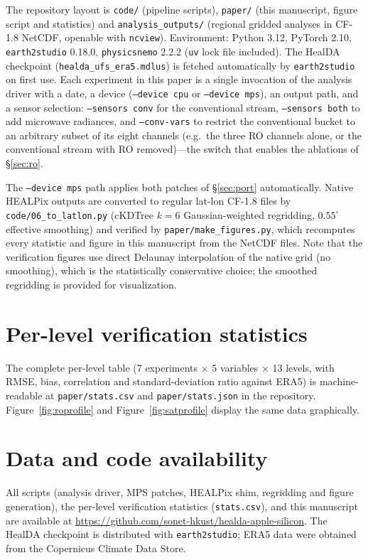 \documentclass[twocolumn,11pt]{article}
\begin{document}
The repository layout is
\texttt{code/} (pipeline scripts), \texttt{paper/} (this manuscript,
figure script and statistics) and \texttt{analysis\_outputs/}
(regional gridded analyses in CF-1.8 NetCDF, openable with
\texttt{ncview}). Environment: Python 3.12, PyTorch 2.10,
\texttt{earth2studio} 0.18.0, \texttt{physicsnemo} 2.2.2
(\texttt{uv} lock file included). The HealDA checkpoint
(\texttt{healda\_ufs\_era5.mdlus}) is fetched automatically by
\texttt{earth2studio} on first use. Each experiment in this paper is
a single invocation of the analysis driver with a date, a device
(\texttt{--device cpu} or \texttt{--device mps}), an output path, and
a sensor selection: \texttt{--sensors conv} for the conventional
stream, \texttt{--sensors both} to add microwave radiances, and
\texttt{--conv-vars} to restrict the conventional bucket to an
arbitrary subset of its eight channels (e.g.\ the three RO channels
alone, or the conventional stream with RO removed)---the switch that
enables the ablations of \S\ref{sec:ro}.

The \texttt{--device mps} path applies both patches of
\S\ref{sec:port} automatically. Native HEALPix outputs are converted
to regular lat-lon CF-1.8 files by
\texttt{code/06\_to\_latlon.py} (cKDTree $k=6$ Gaussian-weighted
regridding, $0.55^{\circ}$ effective smoothing) and verified by
\texttt{paper/make\_figures.py}, which recomputes every statistic and
figure in this manuscript from the NetCDF files. Note that the
verification figures use direct Delaunay interpolation of the native
grid (no smoothing), which is the statistically conservative choice;
the smoothed regridding is provided for visualization.

\section{Per-level verification statistics}\label{app:stats}

The complete per-level table (7 experiments $\times$ 5 variables
$\times$ 13 levels, with RMSE, bias, correlation and
standard-deviation ratio against ERA5) is machine-readable at
\texttt{paper/stats.csv} and \texttt{paper/stats.json} in the
repository. Figure~\ref{fig:roprofile} and
Figure~\ref{fig:satprofile} display the same data graphically.

\section*{Data and code availability}
All scripts (analysis driver, MPS patches, HEALPix shim, regridding
and figure generation), the per-level verification statistics
(\texttt{stats.csv}), and this manuscript are available at
\url{https://github.com/sonet-hkust/healda-apple-silicon}. The
HealDA checkpoint is distributed with \texttt{earth2studio}; ERA5
data were obtained from the Copernicus Climate Data Store.
\end{document}
